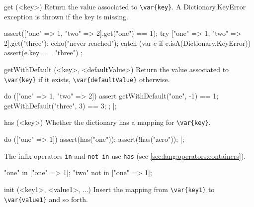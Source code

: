 \begin{urbiscriptapi}


\item[get](<key>)
  Return the value associated to \lstinline|\var{key}|.  A
  Dictionary.KeyError exception is thrown if the key is missing.

\begin{urbiscript}
assert(["one" => 1, "two" => 2].get("one") == 1);
try
{
  ["one" => 1, "two" => 2].get("three");
  echo("never reached");
}
catch (var e if e.isA(Dictionary.KeyError))
{
  assert(e.key == "three")
};
\end{urbiscript}


\item[getWithDefault](<key>, <defaultValue>)
  Return the value associated to  \lstinline|\var{key}| if it exists,
  \lstinline|\var{defaultValue}| otherwise.

\begin{urbiscript}
do (["one" => 1, "two" => 2])
{
  assert
  {
    getWithDefault("one",  -1) == 1;
    getWithDefault("three", 3) == 3;
  };
}|;
\end{urbiscript}


\item[has](<key>)
  Whether the dictionary has a mapping for \lstinline|\var{key}|.

\begin{urbiscript}
do (["one" => 1])
{
  assert(has("one"));
  assert(!has("zero"));
}|;
\end{urbiscript}

  The infix operators \lstinline|in| and \lstinline|not in| use
  \lstinline|has| (see \autoref{sec:lang:operators:containers}).

\begin{urbiassert}
"one" in     ["one" => 1];
"two" not in ["one" => 1];
\end{urbiassert}

\item[init](<key1>, <value1>, ...)%
  Insert the mapping from \lstinline|\var{key1}| to
  \lstinline|\var{value1}| and so forth.


\end{urbiscriptapi}
